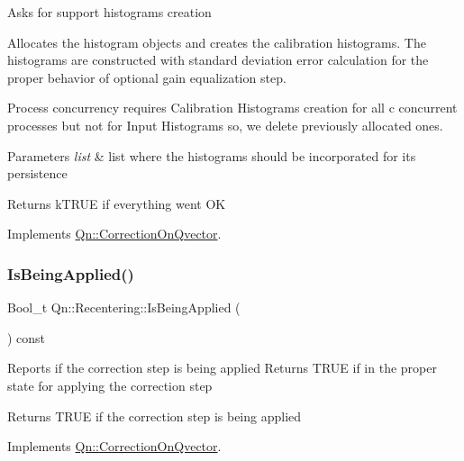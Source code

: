 Asks for support histograms creation

Allocates the histogram objects and creates the calibration histograms. The histograms are constructed with standard deviation error calculation for the proper behavior of optional gain equalization step.

Process concurrency requires Calibration Histograms creation for all c concurrent processes but not for Input Histograms so, we delete previously allocated ones. 
\begin{DoxyParams}{Parameters}
{\em list} & list where the histograms should be incorporated for its persistence \\
\hline
\end{DoxyParams}
\begin{DoxyReturn}{Returns}
k\+T\+R\+UE if everything went OK 
\end{DoxyReturn}


Implements \mbox{\hyperlink{classQn_1_1CorrectionOnQvector_addcdd98787c99ea34a2511be2cdc8de4}{Qn\+::\+Correction\+On\+Qvector}}.

\mbox{\label{classQn_1_1Recentering_a3849efa27b2827a2f307a100bc046916}} 
\subsubsection{\texorpdfstring{Is\+Being\+Applied()}{IsBeingApplied()}}
{\footnotesize\ttfamily Bool\+\_\+t Qn\+::\+Recentering\+::\+Is\+Being\+Applied (\begin{DoxyParamCaption}{ }\end{DoxyParamCaption}) const\hspace{0.3cm}{\ttfamily [virtual]}}

Reports if the correction step is being applied Returns T\+R\+UE if in the proper state for applying the correction step \begin{DoxyReturn}{Returns}
T\+R\+UE if the correction step is being applied 
\end{DoxyReturn}


Implements \mbox{\hyperlink{classQn_1_1CorrectionOnQvector_a4d47a1c241b4bfd5ac98d6fdbc90eb79}{Qn\+::\+Correction\+On\+Qvector}}.

\mbox{\label{classQn_1_1Recentering_a78bd432f4eb1f13cf846176426dbe579}} 
